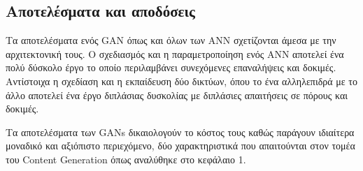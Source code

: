 \subsection{Αποτελέσματα και αποδόσεις}
Τα αποτελέσματα ενός GAN όπως και όλων των ΑΝΝ σχετίζονται άμεσα με την αρχιτεκτονική τους. Ο σχεδιασμός και η παραμετροποίηση ενός ANN αποτελεί ένα πολύ δύσκολο έργο το οποίο περιλαμβάνει συνεχόμενες επαναλήψεις και δοκιμές. Αντίστοιχα η σχεδίαση και η εκπαίδευση δύο δικτύων, όπου το ένα αλληλεπιδρά με το άλλο αποτελεί ένα έργο διπλάσιας δυσκολίας με διπλάσιες απαιτήσεις σε πόρους  και δοκιμές. 
\par
Τα αποτελέσματα των GANs δικαιολογούν το κόστος τους καθώς παράγουν ιδιαίτερα μοναδικό και αξιόπιστο περιεχόμενο, δύο χαρακτηριστικά που απαιτούνται στον τομέα του Content Generation όπως αναλύθηκε στο κεφάλαιο 1.



























